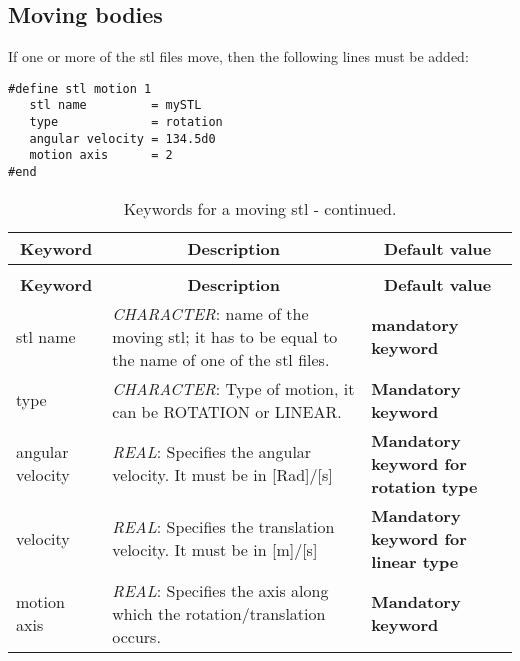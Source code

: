\documentclass[a4paper,10pt]{report}
\begin{document}
\subsection{Moving bodies}

If one or more of the stl files move, then the following lines must be added:
\begin{lstlisting}
#define stl motion 1
   stl name         = mySTL
   type             = rotation 
   angular velocity = 134.5d0
   motion axis      = 2
#end
\end{lstlisting}

\begin{longtable}{|p{4cm}|p{10cm}|p{2.2cm}|}
\caption{Keywords for a moving stl.} \label{tab:movingstl} \\
\hline
\multicolumn{1}{|c|}{\textbf{Keyword}} & \multicolumn{1}{c|}{\textbf{Description}} & \multicolumn{1}{c|}{\textbf{Default value}} \\ \hline
\endfirsthead

\caption{Keywords for a moving stl - continued.} \\
\hline
\multicolumn{1}{|c|}{\textbf{Keyword}} & \multicolumn{1}{c|}{\textbf{Description}} & \multicolumn{1}{c|}{\textbf{Default value}} \\ \hline
\endhead

stl name & \textit{CHARACTER}: name of the moving stl; it has to be equal to the name of one of the stl files. & \textbf{mandatory keyword} \\ \hline

type & \textit{CHARACTER}: Type of motion, it can be ROTATION or LINEAR. & \textbf{Mandatory keyword} \\ \hline

angular velocity & \textit{REAL}: Specifies the angular velocity. It must be in [Rad]/[s] & \textbf{Mandatory keyword for rotation type} \\ \hline

velocity & \textit{REAL}: Specifies the translation velocity. It must be in [m]/[s] & \textbf{Mandatory keyword for linear type} \\ \hline

motion axis & \textit{REAL}: Specifies the axis along which the rotation/translation occurs. & \textbf{Mandatory keyword} \\ \hline

\end{longtable}

\end{document}
